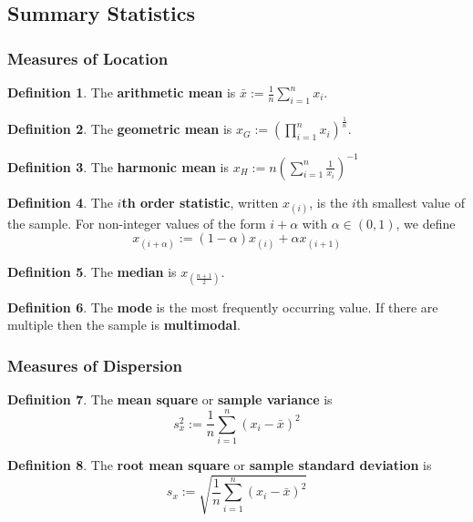 \documentclass[12pt]{article}
\theoremstyle{definition}
\newtheorem*{defn*}{Definition}
\begin{document}
\subsection{Summary Statistics}

\subsubsection{Measures of Location}

\begin{defn*}
  The \textbf{arithmetic mean} is $\bar{x} := \frac{1}{n}\sum_{i = 1}^nx_i$.
\end{defn*}

\begin{defn*}
  The \textbf{geometric mean} is $x_G := \left(\prod_{i = 1}^nx_i\right)^{\frac{1}{n}}$.
\end{defn*}

\begin{defn*}
  The \textbf{harmonic mean} is $x_H := n\left(\sum_{i = 1}^n\frac{1}{x_i}\right)^{-1}$
\end{defn*}

\begin{defn*}
  The \textbf{$i$th order statistic}, written $x_{(i)}$, is the $i$th smallest value of the sample.
  For non-integer values of the form $i + \alpha$ with $\alpha \in (0, 1)$, we define
  $$x_{(i + \alpha)} := (1 - \alpha)x_{(i)} + \alpha x_{(i + 1)}$$
\end{defn*}

\begin{defn*}
  The \textbf{median} is $x_{(\frac{n + 1}{2})}$.
\end{defn*}

\begin{defn*}
  The \textbf{mode} is the most frequently occurring value.
  If there are multiple then the sample is \textbf{multimodal}.
\end{defn*}

\subsubsection{Measures of Dispersion}

\begin{defn*}
  The \textbf{mean square} or \textbf{sample variance} is
  $$s_x^2 := \frac{1}{n}\sum_{i = 1}^n(x_i - \bar{x})^2$$
\end{defn*}

\begin{defn*}
  The \textbf{root mean square} or \textbf{sample standard deviation} is
  $$s_x := \sqrt{\frac{1}{n}\sum_{i = 1}^n(x_i - \bar{x})^2}$$
\end{defn*}
\end{document}
